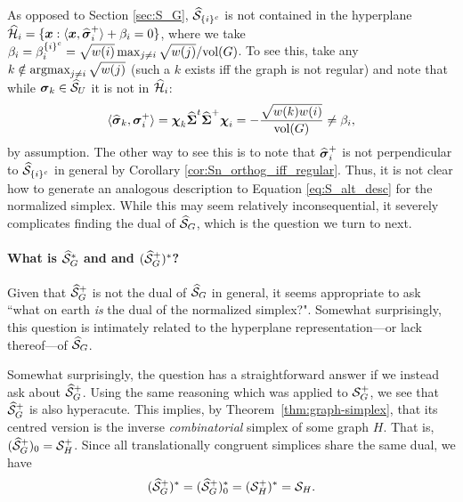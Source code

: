 As opposed to Section \ref{sec:S_G}, $\widehat{\mathcal{S}}_{\{i\}^c} $ is not contained in the hyperplane $\widehat{\mathcal{H}}_i = \{\vb*{x}: \langle \vb*{x},\widehat{\vb*{\sigma}}_i^+\rangle + \beta_i=0\}$, where we take $\beta_i = \beta_i^{\{i\}^c} = \sqrt{w(i)}\max_{j\neq i}\sqrt{w(j)} / \textnormal{vol}(G)$. To see this, take any $k\notin \operatorname*{\textnormal{argmax}}_{j\neq i} \sqrt{w(j)}$ (such a $k$ exists iff the graph is not regular) and note that while $\vb*{\sigma}_k\in\widehat{\mathcal{S}}_U$ it is not in $\widehat{\mathcal{H}}_i$: 
\[\langle \widehat{\vb*{\sigma}}_k,\vb*{\sigma}_i^+\rangle = \boldsymbol{\chi}_k\widehat{\boldsymbol{\Sigma}}^t\widehat{\boldsymbol{\Sigma}}^+\boldsymbol{\chi}_i = -\frac{\sqrt{w(k)w(i)}}{\textnormal{vol}(G)}\neq \beta_i,\]
by assumption. The other way to see this is to note that $\widehat{\vb*{\sigma}}_i^+$ is not perpendicular to $\widehat{\mathcal{S}}_{\{i\}^c}$ in general by Corollary \ref{cor:Sn_orthog_iff_regular}. Thus, it is not  clear how to generate an analogous description to Equation \eqref{eq:S_alt_desc} for the normalized simplex. While this may seem relatively inconsequential, it severely complicates finding the dual of $\widehat{\mathcal{S}}_G$, which is the question we turn to next. 

\paragraph{What is $\widehat{\mathcal{S}}_G^*$ and and $(\widehat{\mathcal{S}}_G^+)^*$?} 
Given that $\widehat{\mathcal{S}}_G^+$ is not the dual of $\widehat{\mathcal{S}}_G$ in general, it  seems appropriate  to  ask ``what on  earth \emph{is} the dual of the normalized simplex?". Somewhat surprisingly, this question is intimately related to the hyperplane representation---or lack thereof---of $\widehat{\mathcal{S}}_G$. 

Somewhat surprisingly, the question has a straightforward answer if we instead  ask about  $\widehat{\mathcal{S}}_G^+$. Using the same reasoning which was applied to $\mathcal{S}_G^+$, we see that $\widehat{\mathcal{S}}_G^+$  is also hyperacute.
This implies, by Theorem~\ref{thm:graph-simplex}, that its centred version is the inverse \emph{combinatorial} simplex of some graph $H$. That is,  $(\widehat{\mathcal{S}}_G^+)_0 = \mathcal{S}_H^+$. Since all translationally congruent simplices  share the same dual, we have 
\begin{equation*}
(\widehat{\mathcal{S}}_G^+)^* = (\widehat{\mathcal{S}}_G^+)^*_0 = (\mathcal{S}_H^+)^* = \mathcal{S}_H.
\end{equation*}


